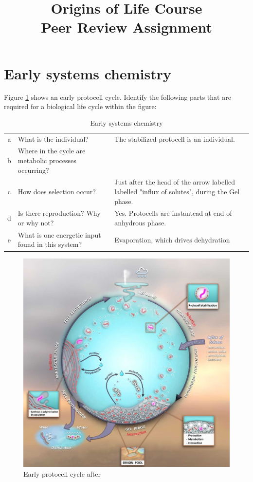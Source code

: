 \documentclass[]{article}
\title{
	Origins of Life Course\\
	Peer Review Assignment
}
\begin{document}
\maketitle

\tableofcontents
\listoffigures

\section{Early systems chemistry}

Figure \ref{fig:damer} shows an early protocell cycle. Identify the following parts that are
required for a biological life cycle within the figure:
\begin{table}[H]
	\caption{Early systems chemistry}	{
	\begin{tabular}{|c|p{3cm}|p{8cm}|}\hline
	a&	What is the individual? &The stabilized protocell is an individual.\\
	b&	Where in the cycle are metabolic processes occurring? &\\
	c&	How does selection occur? &Just after the head of the arrow labelled labelled "influx of solutes", during the Gel phase.\\
	d&	Is there reproduction? Why or why not? &Yes. Protocells are instantead at end of anhydrous phase.\\
	e&	What is one energetic input found in this system?&Evaporation, which drives dehydration\cite{damer2016field}\\\hline
	\end{tabular}}
\end{table}

\begin{figure}[H]
	\caption[Early protocell cycle]{Early protocell cycle after \cite{damer2016field}}\label{fig:damer}
	\includegraphics[width=\textwidth]{WarmLittlePond}
\end{figure}
\end{document}
